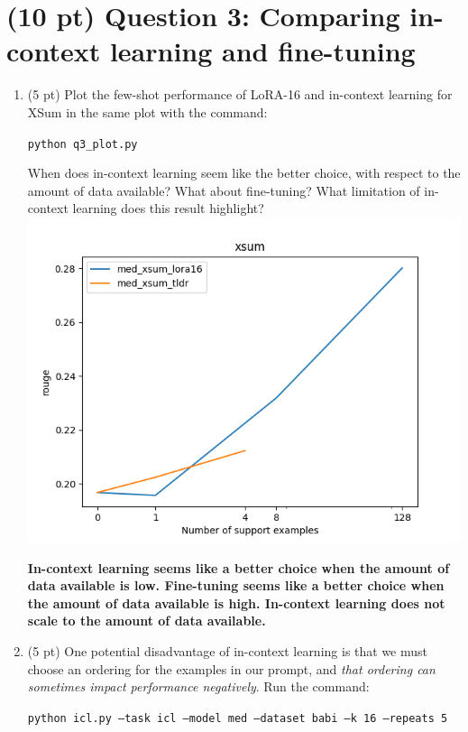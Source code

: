 \documentclass[12pt]{article}
\begin{document}
\section*{(10 pt) Question 3: Comparing in-context learning and fine-tuning}

\begin{enumerate}
    \item (5 pt) Plot the few-shot performance of LoRA-16 and in-context learning for XSum in the same plot with the command:

    {\small\texttt{python q3\_plot.py}}

    When does in-context learning seem like the better choice, with respect to the amount of data available? What about fine-tuning? What limitation of in-context learning does this result highlight?\\    
\includegraphics[width=\linewidth]{hw3_starter_code/starter_code/Q3_1.png}               
    
    \textbf{\color{red}In-context learning seems like a better choice when the amount of data available is low. Fine-tuning seems like a better choice when the amount of data available is high. In-context learning does not scale to the amount of data available.}

    \item (5 pt) One potential disadvantage of in-context learning is that we must choose an ordering for the examples in our prompt, and \textit{that ordering can sometimes impact performance negatively}. Run the command:

    {\small \texttt{python icl.py --task icl --model med --dataset babi --k 16 --repeats 5}}


\end{enumerate}
\end{document}
